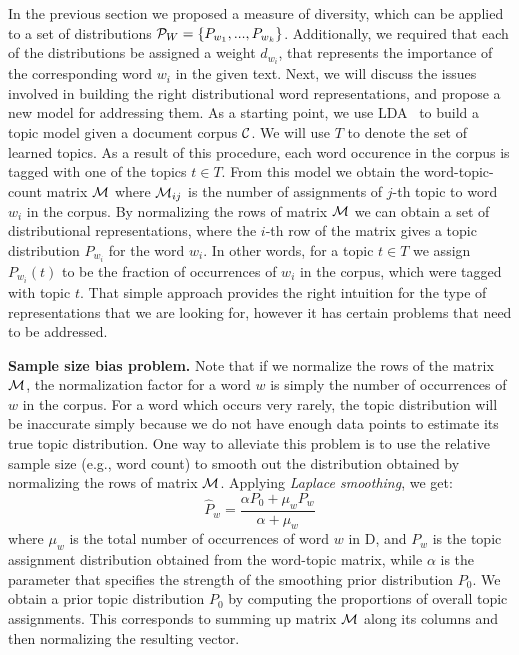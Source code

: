 In the previous section we proposed a measure of diversity, which can
be applied to a set of distributions
${\mathcal P}_{W}=\{P_{w_1},...,P_{w_k}\}$. Additionally, we required that 
each of the distributions be assigned a weight $d_{w_i}$, that
represents the importance of the corresponding word $w_i$ in the given
text. Next, we will discuss the issues involved in building the right
distributional word representations, and propose a new model for
addressing them. As a starting point, we use 
LDA~\cite{Blei:2003:LDA:944919.944937} to build a topic model given a
document corpus ${\mathcal C}$. We will use $T$ to denote
the set of learned topics. As a result of this procedure, each word
occurence in the corpus is tagged with one of the topics $t\in
T$. From this model we obtain the  
word-topic-count matrix ${\mathcal M}$ where ${\mathcal M}_{ij}$ is the number of
assignments of $j$-th topic to word $w_i$ in the corpus. By
normalizing the rows of matrix ${\mathcal M}$ we can obtain 
a set of distributional representations, where the $i$-th row of the
matrix gives a topic distribution $P_{w_i}$ for the word $w_i$. In
other words, for a topic $t\in T$ we assign $P_{w_i}(t)$ to be the
fraction of occurrences of $w_i$ in the corpus, which were tagged with
topic $t$. That simple approach provides the right intuition for the
type of representations that we are looking for, however it has
certain problems that need to be addressed.

{\bf Sample size bias problem.}  Note that 
if we normalize the rows of the matrix ${\mathcal M}$, the normalization factor   
for a word $w$ is simply the number of occurrences of $w$ in the
corpus. For a word which occurs very rarely, the topic
distribution will be inaccurate simply because we do not have 
enough data points to estimate its true topic distribution. 
One way to alleviate this problem is to use the relative sample size
(e.g., word count) to smooth out the distribution obtained by
normalizing the rows of matrix ${\mathcal M}$. 
Applying {\em Laplace smoothing}, we get:
\begin{equation}
\widehat{P}_w=\frac{\alpha P_0+ \mu_w P_w}{\alpha+\mu_w}
\end{equation}
where $\mu_w$ is the total number of occurrences of word $w$ in D, and $P_w$ is the
topic assignment distribution obtained from the word-topic matrix,
while $\alpha$ is the parameter that specifies the strength of the
smoothing prior distribution $P_0$. We obtain a prior 
 topic distribution $P_0$ by computing the proportions of overall topic
 assignments. This corresponds to summing up matrix ${\mathcal M}$ along its
 columns and then normalizing the resulting vector.

